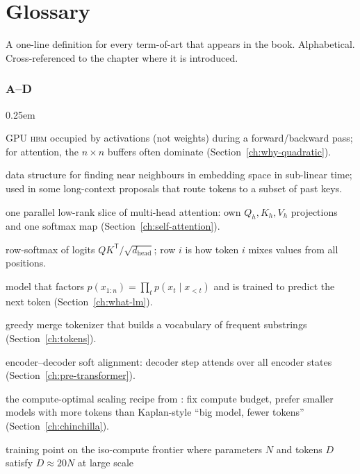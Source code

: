 \chapter{Glossary}
\label{app:glossary}

A one-line definition for every term-of-art that appears in the book.
Alphabetical. Cross-referenced to the chapter where it is introduced.

\subsection*{A--D}

\begin{description}\itemsep0.25em
\item[activation memory] GPU \textsc{hbm} occupied by activations (not weights)
  during a forward/backward pass; for attention, the \(n \times n\) buffers
  often dominate (Section~\ref{ch:why-quadratic}).
\item[ANN (approximate nearest neighbour)] data structure for finding near
  neighbours in embedding space in sub-linear time; used in some long-context
  proposals that route tokens to a subset of past keys.
\item[attention head] one parallel low-rank slice of multi-head attention: own
  \(Q_h,K_h,V_h\) projections and one softmax map (Section~\ref{ch:self-attention}).
\item[attention matrix] row-softmax of logits \(QK^{\mathsf T}/\sqrt{d_{\text{head}}}\);
  row \(i\) is how token \(i\) mixes values from all positions.
\item[autoregressive] model that factors \(p(x_{1:n}) = \prod_t p(x_t \mid x_{<t})\)
  and is trained to predict the next token (Section~\ref{ch:what-lm}).
\item[BPE (byte pair encoding)] greedy merge tokenizer that builds a vocabulary
  of frequent substrings (Section~\ref{ch:tokens}).
\item[Bahdanau attention] encoder--decoder soft alignment: decoder step attends
  over all encoder states (Section~\ref{ch:pre-transformer}).
\item[Chinchilla] the compute-optimal scaling recipe from
  \citet{hoffmann2022training}: fix compute budget, prefer smaller models with
  more tokens than Kaplan-style ``big model, fewer tokens'' (Section~\ref{ch:chinchilla}).
\item[Chinchilla-optimal] training point on the iso-compute frontier where
  parameters \(N\) and tokens \(D\) satisfy \(D \approx 20 N\) at large scale

\end{description}
